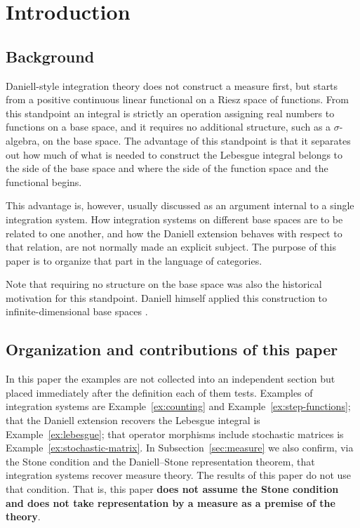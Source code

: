 \section{Introduction}\label{chap:intro}

\subsection{Background}

Daniell-style integration theory \cite{Daniell1918} does not construct a measure
first, but starts from a positive continuous linear functional on a Riesz space
of functions.
From this standpoint an integral is strictly an operation assigning real numbers
to functions on a base space, and it requires no additional structure, such as a
$\sigma$-algebra, on the base space.
The advantage of this standpoint is that it separates out how much of what is
needed to construct the Lebesgue integral belongs to the side of the base space
and where the side of the function space and the functional begins.

This advantage is, however, usually discussed as an argument internal to a
single integration system.
How integration systems on different base spaces are to be related to one
another, and how the Daniell extension behaves with respect to that relation,
are not normally made an explicit subject.
The purpose of this paper is to organize that part in the language of
categories.

Note that requiring no structure on the base space was also the historical
motivation for this standpoint.
Daniell himself applied this construction to infinite-dimensional base spaces
\cite{Daniell1919}.

\subsection{Organization and contributions of this paper}

In this paper the examples are not collected into an independent section but
placed immediately after the definition each of them tests.
Examples of integration systems are
Example~\ref{ex:counting} and Example~\ref{ex:step-functions}; that the Daniell
extension recovers the Lebesgue integral is
Example~\ref{ex:lebesgue}; that operator morphisms include stochastic matrices
is Example~\ref{ex:stochastic-matrix}.
In Subsection~\ref{sec:measure} we also confirm, via the Stone condition and the
Daniell--Stone representation theorem, that integration systems recover measure
theory.
The results of this paper do not use that condition.
That is, this paper \textbf{does not assume the Stone condition and does not
take representation by a measure as a premise of the theory}.

